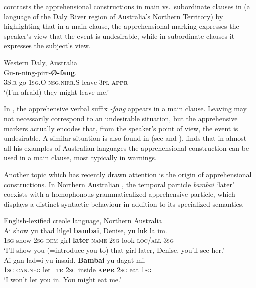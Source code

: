 \documentclass[output=paper,colorlinks,citecolor=brown, language=chinese]{langscibook}
\begin{document}
 \citet[168]{green1989} contrasts the apprehensional constructions in main vs.\ subordinate clauses in  (a language of the Daly River region of Australia's Northern Territory) by highlighting that in a main clause, the apprehensional marking expresses the speaker's view that the event is undesirable, while in subordinate clauses it expresses the subject's view.

\ea
\label{ex:Song2} 
 {Western Daly, Australia}{\cite[80; 170]{green1989}} \\
\gll Gu-n-ning-pirr-\textbf{Ø-fang}. \\
\textsc{3S.r-}go-\textsc{1sg.O-nsg.nirr.S-}leave-\textsc{3pl-\textbf{appr}} \\
\glt `(I'm afraid) they might leave me.'
\z


\noindent In , the apprehensive verbal suffix \textit{-fang} appears in a main clause. Leaving may not necessarily correspond to an undesirable situation, but the apprehensive markers actually encodes that, from the speaker's point of view, the event is undesirable. A similar situation is also found in  (see  and ). \citet[202]{verstraete2006b} finds that in almost all his examples of Australian languages the apprehensional construction can be used in a main clause, most typically in warnings. 

Another topic which has recently drawn attention is the origin of apprehensional constructions. In Northern Australian , the temporal particle \textit{bambai} `later' coexists with a homophonous grammaticalized apprehensive particle, which displays a distinct syntactic  behaviour in addition to its specialized semantics.

\ea 
\label{ex:Song3} 
 {English-lexified creole language, Northern Australia} {\cite[269]{AngeloSchultze-Berndt2016}} \\
\ea \label{ex:Song3a}
\gll Ai show yu thad lilgel \textbf{bambai}, Denise, yu luk la im. \\
\textsc{1sg} show \textsc{2sg} \textsc{dem} girl \textbf{later} \textsc{name} \textsc{2sg} look \textsc{loc/all} \textsc{3sg} \\
\glt `I'll show you (=introduce you to) that girl later, Denise, you'll see her.' \\
\ex \label{ex:Song3b}
\gll Ai gan lad=i yu insaid. \textbf{Bambai} yu dagat mi. \\
\textsc{1sg} \textsc{can.neg} let=\textsc{tr} \textsc{2sg} inside \textbf{\textsc{appr}} \textsc{2sg} eat \textsc{1sg} \\
\glt `I won't let you in. You might eat me.'
\z
\z
\end{document}
